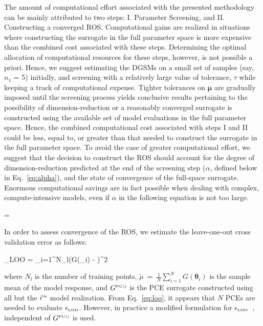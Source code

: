 The amount of computational effort associated with the presented methodology can be mainly attributed to
two steps: I. Parameter Screening, and II. Constructing a converged ROS. Computational gains are realized
in situations where constructing the surrogate in the full parameter space is more expensive than the combined cost
associated with these steps. Determining the optimal allocation of computational resources for these steps, however, 
is not possible a priori. Hence, we suggest estimating the DGSMs on a small set of samples (say, $n_1$ = 5) 
initially, and screening with a relatively large value of tolerance, $\tau$ while keeping a track of computational expense.
Tighter tolerances on $\bm{\mu}$ are
gradually imposed until the screening process yields conclusive results pertaining to the possibility of dimension-reduction
or a reasonably converged surrogate is constructed using the available set of model evaluations in the full parameter space. 
Hence, the combined computational cost associated with steps I and II could be less, equal to, or greater than that needed
to construct the surrogate in the full parameter space. To avoid the case of greater computational effort, we suggest 
that the decision to construct the ROS should account for the degree of dimension-reduction predicted at the end of the
screening step ($\alpha$, defined below in Eq.~\ref{eq:alpha}), and the state of convergence of the full-space surrogate. 
Enormous computational savings are in fact possible when dealing with complex, 
compute-intensive models, even if $\alpha$ in the following equation is
not too large. 

\be
\alpha = 
\label{eq:alpha}
\ee

In order to assess convergence of the ROS, we estimate the leave-one-out cross validation error as
follows:

\be
\epsilon_{\mbox{\tiny LOO}} = 
{\sum\limits_{i=1}^{N_l}\left(G(\bm{\theta}_i) - \widetilde{\mu}\right)^2}
\label{eq:loo}
\ee

\noindent where $N_l$ is the number of training points, 
$\widetilde{\mu}~=~\frac{1}{N}\sum\limits_{i=1}^N G(\bm{\theta}_i)$
is the sample mean of the model response, and $ G^{\mbox{\tiny {PC}\textbackslash i}}$
is the PCE surrogate constructed using all but the $i^{\mbox{\tiny{th}}}$ model realization. 
From Eq.~\ref{eq:loo}, it appears that $N$ PCEs are needed to evaluate $\epsilon_{\mbox{\tiny LOO}}$.
However, in practice a modified formulation for $\epsilon_{\mbox{\tiny LOO}}$~\cite{Blatman:2009},
independent of $G^{\mbox{\tiny {PC}\textbackslash i}}$ is used.

